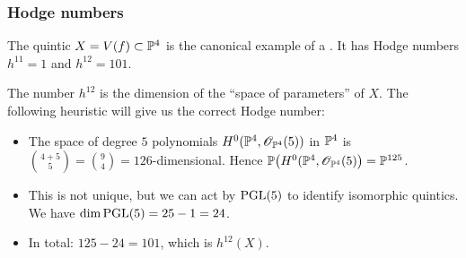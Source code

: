 
\begin{frame}
\frametitle{Hodge numbers}

The quintic $X = V(f) \subset \P^4$ is the canonical example of a \CY. It has Hodge numbers $h^{11}=1$ and $h^{12}=101$.

\begin{remark}[Heuristic]
    The number $h^{12}$ is the dimension of the ``space of parameters'' of $X$. The following heuristic will give us the correct Hodge number:
    \begin{itemize}
	    \item
	    The space of degree $5$ polynomials $H^0(\P^4, \OO_{\P^4}(5))$ in $\P^4$ is $\binom{4 + 5}{5} = \binom{9}{4} = 126$-dimensional. Hence $\P\big(H^0(\P^4, \OO_{\P^4}(5)\big) = \P^{125}$.

	    \item
	    This is not unique, but we can act by $\PGL(5)$ to identify isomorphic quintics. We have $\dim \PGL(5)=25-1=24$.

	    \item
	    In total: $125 - 24 = 101$, which is $h^{12}(X)$.
    \end{itemize}
\end{remark}

\end{frame}